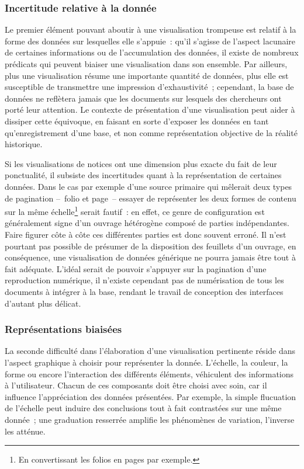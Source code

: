 \documentclass[a4paper,12pt,twoside]{book}
\newcommand{\bdd}{base de données\xspace}
\begin{document}
			\subsubsection{Incertitude relative à la donnée}
Le premier élément pouvant aboutir à une visualisation trompeuse est relatif à la forme des données sur lesquelles elle s'appuie~: qu'il s'agisse de l'aspect lacunaire de certaines informations ou de l'accumulation des données, il existe de nombreux prédicats qui peuvent biaiser une visualisation dans son ensemble. Par ailleurs, plus une visualisation résume une importante quantité de données, plus elle est susceptible de transmettre une impression d'exhaustivité~; cependant, la \bdd ne reflètera jamais que les documents sur lesquels des chercheurs ont porté leur attention. Le contexte de présentation d'une visualisation peut aider à dissiper cette équivoque, en faisant en sorte d'exposer les données en tant qu'enregistrement d'une base, et non comme représentation objective de la réalité historique.

Si les visualisations de notices ont une dimension plus exacte du fait de leur ponctualité, il subsiste des incertitudes quant à la représentation de certaines données. Dans le cas par exemple d'une source primaire qui mêlerait deux types de pagination –~folio et page~– essayer de représenter les deux formes de contenu sur la même échelle\footnote{En convertissant les folios en pages par exemple.} serait fautif~: en effet, ce genre de configuration est généralement signe d'un ouvrage hétérogène composé de parties indépendantes. Faire figurer côte à côte ces différentes parties est donc souvent erroné. Il n'est pourtant pas possible de présumer de la disposition des feuillets d'un ouvrage, en conséquence, une visualisation de données générique ne pourra jamais être tout à fait adéquate. L'idéal serait de pouvoir s'appuyer sur la pagination d'une reproduction numérique, il n'existe cependant pas de numérisation de tous les documents à intégrer à la base, rendant le travail de conception des interfaces d'autant plus délicat.

			\subsubsection{Représentations biaisées}
La seconde difficulté dans l'élaboration d'une visualisation pertinente réside dans l'aspect graphique à choisir pour représenter la donnée. L'échelle, la couleur, la forme ou encore l'interaction des différents éléments, véhiculent des informations à l'utilisateur. Chacun de ces composants doit être choisi avec soin, car il influence l'appréciation des données présentées. Par exemple, la simple flucuation de l'échelle peut induire des conclusions tout à fait contrastées sur une même donnée~; une graduation resserrée amplifie les phénomènes de variation, l'inverse les atténue.
\end{document}

